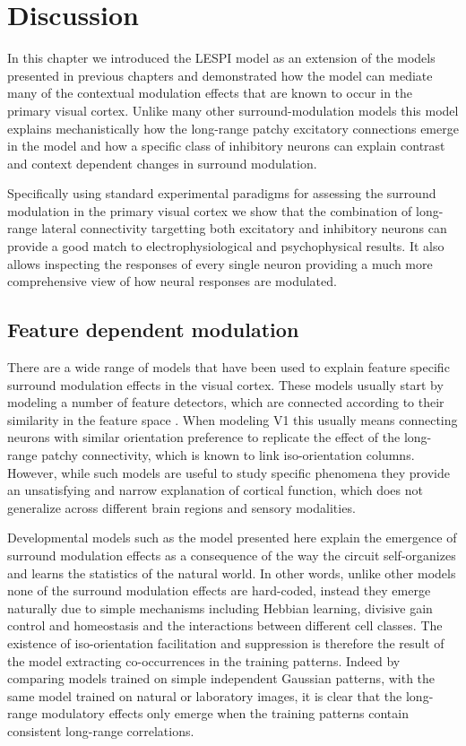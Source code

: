\section{Discussion}

In this chapter we introduced the LESPI model as an extension of the
models presented in previous chapters and demonstrated how the model
can mediate many of the contextual modulation effects that are known
to occur in the primary visual cortex. Unlike many other 
surround-modulation models this model explains mechanistically how the
long-range patchy excitatory connections emerge in the model and how a
specific class of inhibitory neurons can explain contrast and context
dependent changes in surround modulation.

Specifically using standard experimental paradigms for assessing the
surround modulation in the primary visual cortex we show that the
combination of long-range lateral connectivity targetting both
excitatory and inhibitory neurons can provide a good match to
electrophysiological and psychophysical results. It also allows
inspecting the responses of every single neuron providing a much more
comprehensive view of how neural responses are modulated.

\subsection{Feature dependent modulation}

There are a wide range of models that have been used to explain
feature specific surround modulation effects in the visual
cortex. These models usually start by modeling a number of feature
detectors, which are connected according to their similarity in the
feature space \citep{Li2002, Schwabe2006}. When modeling V1 this
usually means connecting neurons with similar orientation preference
to replicate the effect of the long-range patchy connectivity, which
is known to link iso-orientation columns. However, while such models
are useful to study specific phenomena they provide an unsatisfying
and narrow explanation of cortical function, which does not generalize
across different brain regions and sensory modalities.

Developmental models such as the model presented here explain the
emergence of surround modulation effects as a consequence of the way
the circuit self-organizes and learns the statistics of the natural
world. In other words, unlike other models none of the surround
modulation effects are hard-coded, instead they emerge naturally due
to simple mechanisms including Hebbian learning, divisive gain control
and homeostasis and the interactions between different cell
classes. The existence of iso-orientation facilitation and suppression
is therefore the result of the model extracting co-occurrences in the
training patterns. Indeed by comparing models trained on simple
independent Gaussian patterns, with the same model trained on natural
or laboratory images, it is clear that the long-range modulatory
effects only emerge when the training patterns contain consistent
long-range correlations.

